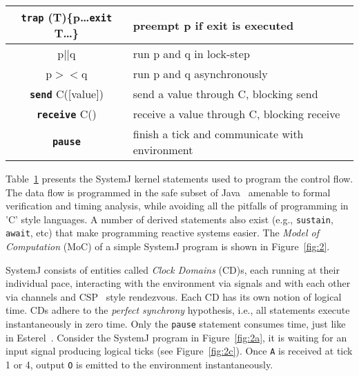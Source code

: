 \begin{table}[tb]
\begin{minipage}{8cm}
\begin{scriptsize}
\begin{tabular}{|c|p{80pt}|}
     \textbf{\texttt{trap}} (T)\{p\ldots \textbf{\texttt{exit}} T\ldots\} & preempt p if exit is executed\\                         
     \hline                                                                                     
     p\textbf{\texttt{$||$}}q & run p and q in lock-step\\                                                        
     \hline                                                                                     
     p$><$q & run p and q asynchronously\\                                                      
     \hline                                                                                     
     \textbf{\texttt{send}} C([value]) & send a value through C, blocking
     send\\                                                 
     \hline                                                                                     
     \textbf{\texttt{receive}} C() & receive a value through C, blocking
     receive\\
     \hline                                                                                     
     \textbf{\texttt{pause}} & finish a tick and communicate
     with environment\\
     \hline                                                                                     
   \end{tabular}
  \end{scriptsize}
 \end{minipage}
 \label{tab:1}
\end{table}

Table~\ref{tab:1} presents the SystemJ kernel statements used to program
the control flow. The data flow is programmed in the safe subset of
Java~\cite{scj2013} amenable to formal verification and timing analysis,
while avoiding all the pitfalls of programming in 'C' style languages. A
number of derived statements also exist (e.g., \texttt{sustain},
\texttt{await}, etc) that make programming reactive systems easier. The
\textit{Model of Computation} (MoC) of a simple SystemJ program is shown
in Figure~\ref{fig:2}.

SystemJ consists of entities called \textit{Clock Domains} (CD)s, each
running at their individual pace, interacting with the environment via
signals and with each other via channels and CSP~\cite{choa85} style
rendezvous. Each CD has its own notion of logical time. CDs adhere to
the \textit{perfect synchrony} hypothesis, i.e., all statements execute
instantaneously in zero time. Only the \texttt{pause} statement consumes
time, just like in Esterel~\cite{gber931}. Consider the SystemJ program
in Figure~\ref{fig:2a}, it is waiting for an input signal producing
logical ticks (see Figure~\ref{fig:2c}). Once \texttt{A} is received at
tick 1 or 4, output \texttt{O} is emitted to the environment
instantaneously.


